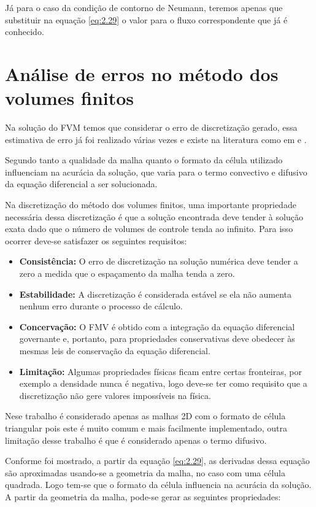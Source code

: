 Já para o caso da condição de contorno de Neumann, teremos apenas que substituir na equação \ref{eq:2.29} o valor para o fluxo correspondente que já é conhecido.

\section{Análise de erros no método dos volumes finitos}

Na solução do FVM temos que considerar o erro de discretização gerado, essa estimativa de erro já foi realizado várias vezes e existe na literatura como em \cite{Jasak1996} e \cite{Muzaferija2014}.

Segundo \cite{Juretic2004} tanto a qualidade da malha quanto o formato da célula utilizado influenciam na acurácia da solução, que varia para o termo convectivo e difusivo da equação diferencial a ser solucionada.

Na discretização do método dos volumes finitos, uma importante propriedade necessária dessa discretização é que a solução encontrada deve tender à solução exata dado que o número de volumes de controle tenda ao infinito. Para isso ocorrer deve-se satisfazer os seguintes requisitos:
\begin{itemize}
    \item \textbf{Consistência:} O erro de discretização na solução numérica deve tender a zero a medida que o espaçamento da malha tenda a zero.
    \item \textbf{Estabilidade:} A discretização é considerada estável se ela não aumenta nenhum erro durante o processo de cálculo.
    \item \textbf{Concervação:} O FMV é obtido com a integração da equação diferencial governante e, portanto, para propriedades conservativas deve obedecer às mesmas leis de conservação da equação diferencial.
    \item \textbf{Limitação:} Algumas propriedades físicas ficam entre certas fronteiras, por exemplo a densidade nunca é negativa, logo deve-se ter como requisito que a discretização não gere valores impossíveis na física.
\end{itemize}
\cite{Juretic2004}

Nese trabalho é considerado apenas as malhas 2D com o formato de célula triangular pois este é muito comum e mais facilmente implementado, outra limitação desse trabalho é que é considerado apenas o termo difusivo.

Conforme foi mostrado, a partir da equação \ref{eq:2.29}, as derivadas dessa equação são aproximadas usando-se a geometria da malha, no caso com uma célula quadrada. Logo tem-se que o formato da célula influencia na acurácia da solução. A partir da geometria da malha, pode-se gerar as seguintes propriedades:

